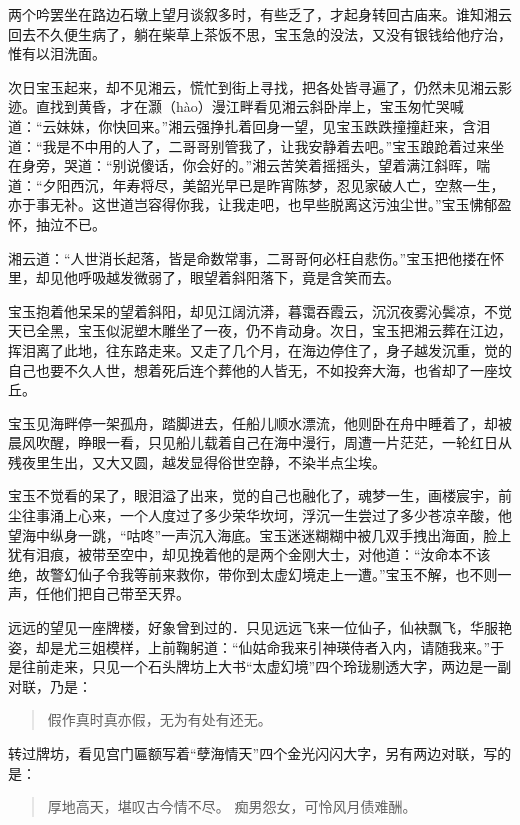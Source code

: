 \documentclass[12pt,oneside]{book}
\newenvironment{shici}{%
\begin{verse}%
\centering\large\hspace{12pt}}%
{\end{verse}}
\begin{document}
两个吟罢坐在路边石墩上望月谈叙多时，有些乏了，才起身转回古庙来。谁知湘云回去不久便生病了，躺在柴草上茶饭不思，宝玉急的没法，又没有银钱给他疗治，惟有以泪洗面。

次日宝玉起来，却不见湘云，慌忙到街上寻找，把各处皆寻遍了，仍然未见湘云影迹。直找到黄昏，才在灏（hào）漫江畔看见湘云斜卧岸上，宝玉匆忙哭喊道：“云妹妹，你快回来。”湘云强挣扎着回身一望，见宝玉跌跌撞撞赶来，含泪道：“我是不中用的人了，二哥哥别管我了，让我安静着去吧。”宝玉踉跄着过来坐在身旁，哭道：“别说傻话，你会好的。”湘云苦笑着摇摇头，望着满江斜晖，喘道：“夕阳西沉，年寿将尽，美韶光早已是昨宵陈梦，忍见家破人亡，空熬一生，亦于事无补。这世道岂容得你我，让我走吧，也早些脱离这污浊尘世。”宝玉怫郁盈怀，抽泣不已。

湘云道：“人世消长起落，皆是命数常事，二哥哥何必枉自悲伤。”宝玉把他搂在怀里，却见他呼吸越发微弱了，眼望着斜阳落下，竟是含笑而去。

宝玉抱着他呆呆的望着斜阳，却见江阔沆漭，暮霭吞霞云，沉沉夜雾沁鬓凉，不觉天已全黑，宝玉似泥塑木雕坐了一夜，仍不肯动身。次日，宝玉把湘云葬在江边，挥泪离了此地，往东路走来。又走了几个月，在海边停住了，身子越发沉重，觉的自己也要不久人世，想着死后连个葬他的人皆无，不如投奔大海，也省却了一座坟丘。

宝玉见海畔停一架孤舟，踏脚进去，任船儿顺水漂流，他则卧在舟中睡着了，却被晨风吹醒，睁眼一看，只见船儿载着自己在海中漫行，周遭一片茫茫，一轮红日从残夜里生出，又大又圆，越发显得俗世空静，不染半点尘埃。

宝玉不觉看的呆了，眼泪溢了出来，觉的自己也融化了，魂梦一生，画楼宸宇，前尘往事涌上心来，一个人度过了多少荣华坎坷，浮沉一生尝过了多少苍凉辛酸，他望海中纵身一跳，“咕咚”一声沉入海底。宝玉迷迷糊糊中被几双手拽出海面，脸上犹有泪痕，被带至空中，却见挽着他的是两个金刚大士，对他道：“汝命本不该绝，故警幻仙子令我等前来救你，带你到太虚幻境走上一遭。”宝玉不解，也不则一声，任他们把自己带至天界。

远远的望见一座牌楼，好象曾到过的．只见远远飞来一位仙子，仙袂飘飞，华服艳姿，却是尤三姐模样，上前鞠躬道：“仙姑命我来引神瑛侍者入内，请随我来。”于是往前走来，只见一个石头牌坊上大书“太虚幻境”四个玲珑剔透大字，两边是一副对联，乃是：

\begin{shici}
假作真时真亦假，无为有处有还无。
\end{shici}

转过牌坊，看见宫门匾额写着“孽海情天”四个金光闪闪大字，另有两边对联，写的是：

\begin{shici}
厚地高天，堪叹古今情不尽。
痴男怨女，可怜风月债难酬。
\end{shici}
\end{document}
